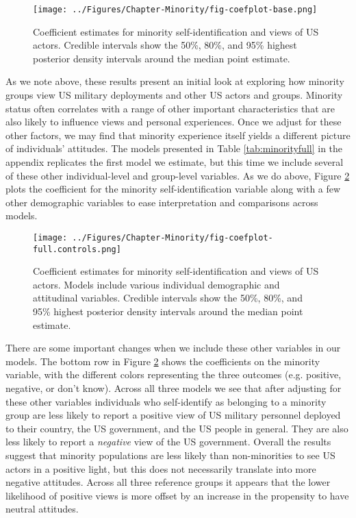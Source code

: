 \begin{figure}[t]
	\texttt{[image: ../Figures/Chapter-Minority/fig-coefplot-base.png]}
	\caption{Coefficient estimates for minority self-identification and views of US actors. Credible intervals show the 50\%, 80\%, and 95\% highest posterior density intervals around the median point estimate. }
	\label{fig:minoritycoefbase}
\end{figure}


As we note above, these results present an initial look at exploring how minority groups view US military deployments and other US actors and groups. Minority status often correlates with a range of other important characteristics that are also likely to influence views and personal experiences. Once we adjust for these other factors, we may find that minority experience itself yields a different picture of individuals' attitudes. The models presented in Table \ref{tab:minorityfull} in the appendix replicates the first model we estimate, but this time we include several of these other individual-level and group-level variables. As we do above, Figure \ref{fig:minoritycoeffull} plots the coefficient for the minority self-identification variable along with a few other demographic variables to ease interpretation and comparisons across models. 


\begin{figure}[t]
	\texttt{[image: ../Figures/Chapter-Minority/fig-coefplot-full.controls.png]}
	\caption{Coefficient estimates for minority self-identification and views of US actors. Models include various individual demographic and attitudinal variables. Credible intervals show the 50\%, 80\%, and 95\% highest posterior density intervals around the median point estimate.}
	\label{fig:minoritycoeffull}
\end{figure}



There are some important changes when we include these other variables in our models. The bottom row in Figure \ref{fig:minoritycoeffull} shows the coefficients on the minority variable, with the different colors representing the three outcomes (e.g. positive, negative, or don't know). Across all three models we see that after adjusting for these other variables individuals who self-identify as belonging to a minority group are less likely to report a positive view of US military personnel deployed to their country, the US government, and the US people in general. They are also less likely to report a \textit{negative} view of the US government. Overall the results suggest that minority populations are less likely than non-minorities to see US actors in a positive light, but this does not necessarily translate into more negative attitudes. Across all three reference groups it appears that the lower likelihood of positive views is more offset by an increase in the propensity to have neutral attitudes. 


